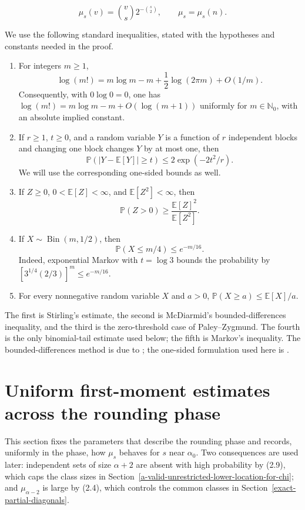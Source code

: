 \documentclass[a4paper,10pt,reqno]{amsart}
\numberwithin{equation}{section}
\newcommand{\Prob}[1]{\mathbb{P}\!\left(#1\right)}
\newcommand{\Exp}[1]{\mathbb{E}\!\left[#1\right]}
\theoremstyle{plain}
\theoremstyle{remark}
\begin{document}
\[
 \mu_s(v)=\binom vs2^{-\binom s2},\qquad \mu_s=\mu_s(n). \tag{1.1}
\]

We use the following standard inequalities, stated with the hypotheses
and constants needed in the proof.

\begin{enumerate}
\def\labelenumi{\arabic{enumi}.}
\tightlist
\item
  For integers \(m\ge 1\), \[
   \log(m!)=m\log m-m+\frac12\log(2\pi m)+O(1/m).          \tag{1.2}
  \] Consequently, with \(0\log 0=0\), one has
  \(\log(m!)=m\log m-m+O(\log(m+1))\) uniformly for
  \(m\in\mathbb N_0\), with an absolute implied constant.
\item
  If \(r\ge1\), \(t\ge0\), and a random variable \(Y\) is a function of \(r\)
  independent blocks and changing one block changes \(Y\) by at
  most one, then \[
   \Prob{\lvert Y-\Exp{Y}\rvert\ge t}
   \le2\exp(-2t^2/r).                                    \tag{1.3}
  \] We will use the corresponding one-sided bounds as well.
\item
  If \(Z\ge 0\), \(0<\Exp{Z}<\infty\), and \(\Exp{Z^2}<\infty\), then \[
   \Prob{Z>0}\ge\frac{\Exp{Z}^2}{\Exp{Z^2}}.             \tag{1.4}
  \]
\item
  If \(X\sim\operatorname{Bin}(m,1/2)\), then \[
   \Prob{X\le m/4}\le e^{-m/16}.                         \tag{1.5}
  \] Indeed, exponential Markov with \(t=\log 3\) bounds the
  probability by
  \([3^{1/4}(2/3)]^m\le e^{-m/16}\).
\item
  For every nonnegative random variable \(X\) and \(a>0\),
  \(\Prob{X\ge a}\le \Exp{X}/a\).
\end{enumerate}

The first is Stirling's estimate, the second is McDiarmid's
bounded-differences inequality, and the third is the zero-threshold case of
Paley--Zygmund. The fourth is the only binomial-tail estimate used
below; the fifth is Markov's inequality. The bounded-differences method is due to
\citet{mcdiarmid-1989}; the one-sided formulation used here is
\citet[Theorem~3.1]{mcdiarmid-1998}.



\section{Uniform first-moment estimates across the rounding phase}
\label{the-complete-independence-number-phase}

This section fixes the parameters that describe the rounding phase and
records, uniformly in the phase, how $\mu_s$ behaves for $s$ near
$\alpha_0$. Two consequences are used later: independent sets of size
$\alpha+2$ are absent with high probability by (2.9), which caps the class
sizes in Section~\ref{a-valid-unrestricted-lower-location-for-chi}; and
$\mu_{\alpha-2}$ is large by (2.4), which controls the common classes in
Section~\ref{exact-partial-diagonals}.
\end{document}
